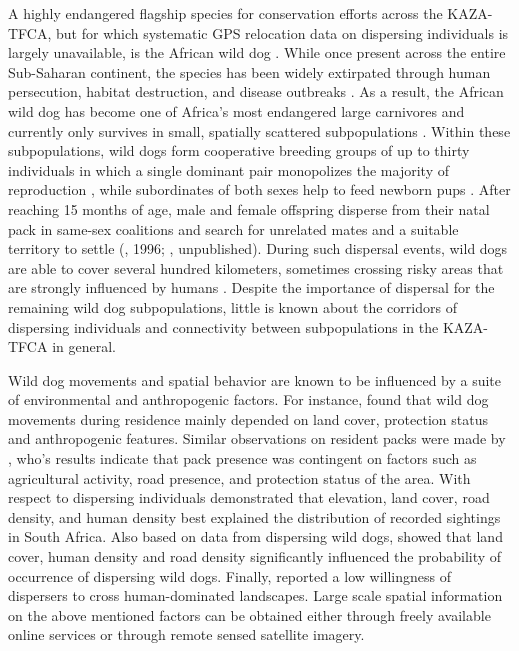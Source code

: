 \documentclass[abstract=on,10pt,a4paper,bibliography=totocnumbered]{scrartcl}
\begin{document}
A highly endangered flagship species for conservation efforts across the
KAZA-TFCA, but for which systematic GPS relocation data on dispersing
individuals is largely unavailable, is the African wild dog
\citep{VanDerMeer.2016}. While once present across the entire Sub-Saharan
continent, the species has been widely extirpated through human persecution,
habitat destruction, and disease outbreaks \citep{Woodroffe.2012}. As a result,
the African wild dog has become one of Africa's most endangered large carnivores
and currently only survives in small, spatially scattered subpopulations
\citep{Woodroffe.2012}. Within these subpopulations, wild dogs form cooperative
breeding groups of up to thirty individuals in which a single dominant pair
monopolizes the majority of reproduction \citep{Frame.1979, Fuller.1992,
Creel.2002}, while subordinates of both sexes help to feed newborn pups
\citep{Malcolm.1982}. After reaching 15 months of age, male and female offspring
disperse from their natal pack in same-sex coalitions and search for unrelated
mates and a suitable territory to settle (\citeauthor{McNutt.1996}, 1996;
\citeauthor{Behr.2019}, unpublished). During such dispersal events, wild dogs
are able to cover several hundred kilometers, sometimes crossing risky areas
that are strongly influenced by humans \citep{DaviesMostert.2012, Masenga.2016,
Cozzi.2020}. Despite the importance of dispersal for the remaining wild dog
subpopulations, little is known about the corridors of dispersing individuals
and connectivity between subpopulations in the KAZA-TFCA in general.

Wild dog movements and spatial behavior are known to be influenced by a suite of
environmental and anthropogenic factors. For instance, \cite{Abrahms.2017} found
that wild dog movements during residence mainly depended on land cover,
protection status and anthropogenic features. Similar observations on resident
packs were made by \cite{Pretorius.2019}, who's results indicate that pack
presence was contingent on factors such as agricultural activity, road presence,
and protection status of the area. With respect to dispersing individuals
\cite{Whittington.2011} demonstrated that elevation, land cover, road density,
and human density best explained the distribution of recorded sightings in South
Africa. Also based on data from dispersing wild dogs, \cite{Jackson.2016} showed
that land cover, human density and road density significantly influenced the
probability of occurrence of dispersing wild dogs. Finally, \cite{Masenga.2016}
reported a low willingness of dispersers to cross human-dominated landscapes.
Large scale spatial information on the above mentioned factors can be obtained
either through freely available online services or through remote sensed
satellite imagery.
\end{document}
